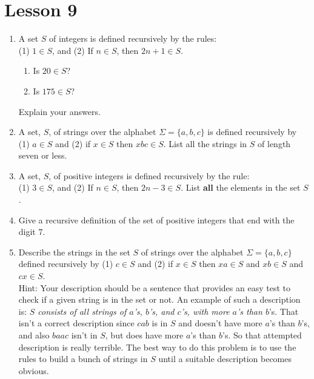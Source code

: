 \documentclass[11pt]{amsart}
\begin{document}
 \section{Lesson 9}
 
 \begin{enumerate}
 
 \item A set $S$ of integers is defined recursively by the rules: \\[2pt]
 (1) $1\in S$, and (2) If $n\in S$, then
 $2n+1 \in S$. \\[2pt]
 
 \begin{enumerate} 
 \item Is $20\in S$?\\[2pt]
 \item Is $175\in S$?\\[2pt]
 \end{enumerate}
 Explain your answers.\\[5pt]
 
 \item A set, $S$, of strings over the alphabet 
$\Sigma = \{a,b,c\}$ is defined recursively by (1) $a \in S$
and (2) if $x\in S$ then $xbc\in S$. List all the strings in $S$ of length seven or less.\\[5pt]


\item A set, $S$, of positive integers is defined recursively by the rule:\\[2pt]
(1) $3\in S$, and (2) If $n\in S$, then $2n-3\in S$. List {\bfseries all} the elements in the set $S$.\\[5pt]
 
 \item Give a recursive definition of the set of positive integers that end with the digit $7$.\\[5pt]

 
\item Describe the strings in the set $S$ of strings over the alphabet 
$\Sigma = \{a,b,c\}$ defined recursively by (1) $ c \in S$
and (2) if $x\in S$ then $xa\in S$ and $xb\in S$ and $cx\in S$.\\[5pt]

Hint: Your description should be a sentence that provides an easy test to check if a given string
is in the set or not. An example of such a description is: {\it $S$ consists of all strings of $a$'s, $b$'s, and $c$'s,
with more $a$'s than $b$}'s. That isn't a correct description since $cab$ is in $S$ and doesn't have more $a$'s than
$b$'s, and also $baac$ isn't in $S$, but does have more $a$'s than $b$'s. So that attempted description is really 
terrible. The best way to do this problem is to use the rules to build a bunch of strings in $S$ until a suitable
description becomes obvious.\\[5pt]


\end{enumerate}
\end{document}
